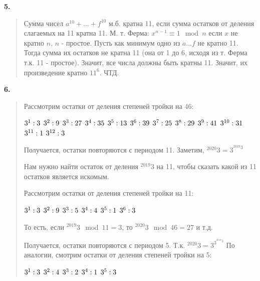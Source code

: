 \documentclass{article}
\begin{document}
\textbf{\textsf{5.}}
\begin{quote}
Сумма чисел $a^{10} + ... + f^{10}$ м.б. кратна 11, если сумма остатков от деления слагаемых на 11 кратна 11. М. т. Ферма: $x^{n-1} \equiv 1 \mod n$ если $x$ не кратно $n$, $n$ - простое. Пусть как минимум одно из $a ... f$ не кратно 11. Тогда сумма их остатков не кратна 11 (она от 1 до 6, исходя из т. Ферма т.к. 11 - простое). Значит, все числа должны быть кратны 11. Значит, их произведение кратно $11^6$. ЧТД.
\end{quote}

\textbf{\textsf{6.}}
\begin{quote}
Рассмотрим остатки от деления степеней тройки на 46:

\begin{center}
    $3^1: 3\\$
    $3^2: 9\\$
    $3^3: 27\\$
    $3^4: 35\\$
    $3^5: 13\\$
    $3^6: 39\\$
    $3^7: 25\\$
    $3^8: 29\\$
    $3^9: 41\\$
    $3^{10}: 31\\$
    $3^{11}: 1\\$
    $3^{12}: 3\\$
    
\end{center}

Получается, остатки повторяются с периодом 11. Заметим, $^{2020} 3 = 3^{^{2019} 3}$

Нам нужно найти остаток от деления $^{2019} 3$ на 11, чтобы сказать какой из 11 остатков является искомым.

Рассмотрим остатки от деления степеней тройки на 11:

\begin{center}
    $3^1: 3\\$
    $3^2: 9\\$
    $3^3: 5\\$
    $3^4: 4\\$
    $3^5: 1\\$
    $3^6: 3\\$
\end{center}

То есть, если $^{2019} 3 \mod 11 = 3$, то $^{2020} 3 \mod 46 = 27$ и т.д.

Получается, остатки повторяются с периодом 5.  
Т.к. $^{2020} 3 = 3^{3^{^{2018} 3}}$ По аналогии, смотрим остатки от деления степеней тройки на 5:
\begin{center}
    $3^1: 3\\$
    $3^2: 4\\$
    $3^3: 2\\$
    $3^4: 1\\$
    $3^5: 3\\$
\end{center}


\end{quote}
\end{document}
